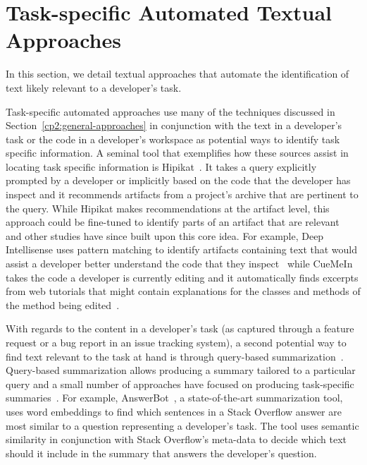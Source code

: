 



\section{Task-specific Automated Textual Approaches}
\label{cp2:task-approaches}



In this section, we detail textual approaches that automate the identification 
of text likely relevant to a developer's task. 



Task-specific automated approaches 
use many of the techniques discussed in Section~\ref{cp2:general-approaches}
in conjunction with the text in a developer's task
 or the code in a developer's workspace
as potential ways  
to identify task specific information.
A seminal tool that exemplifies 
how these sources assist in locating task specific information is
Hipikat~\cite{Cubranic2005}.
It takes a query explicitly prompted by a developer 
or implicitly based on the code that the developer 
has inspect and  
it recommends artifacts from a project's archive 
that are pertinent to the query.
While Hipikat makes recommendations at the artifact level,  
this approach could be fine-tuned to identify 
parts of an artifact that are relevant~\cite{Cubranic2005}
and other studies have since built upon this core idea. 
For example, Deep Intellisense 
uses pattern matching to 
identify 
artifacts containing text that 
would assist a developer
better understand the code that they inspect~\cite{Holmes2008}
while 
CueMeIn takes the code 
a developer is currently editing and it
automatically finds 
excerpts from web tutorials 
that might contain explanations 
for the classes and methods 
of the method being edited~\cite{sun2021}. 






With regards to the content in a developer's task (as captured through a feature 
request or a bug report in an issue tracking system),
a second potential way to find text relevant to the task at hand is through query-based summarization~\cite{Goldsteinet1999}.
Query-based summarization allows 
producing a summary tailored to a particular query
and a small number of approaches have focused on
producing task-specific summaries~\cite{Xu2017, silva2019, liu2019qapi}.
For example, AnswerBot~\cite{Xu2017}, a state-of-the-art summarization tool, 
uses word embeddings to find which sentences in a Stack Overflow answer 
are most similar to a question  representing a developer's task.
The tool uses semantic similarity in conjunction with 
Stack Overflow's meta-data to decide which text should it include
in the summary that answers the developer's question. 





